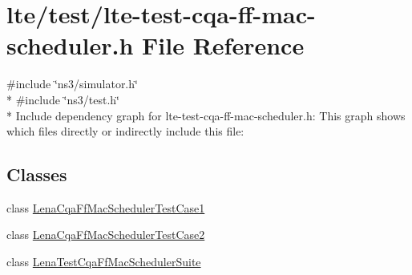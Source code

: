 \hypertarget{lte-test-cqa-ff-mac-scheduler_8h}{}\section{lte/test/lte-\/test-\/cqa-\/ff-\/mac-\/scheduler.h File Reference}
\label{lte-test-cqa-ff-mac-scheduler_8h}
{\ttfamily \#include \char`\"{}ns3/simulator.\+h\char`\"{}}\\*
{\ttfamily \#include \char`\"{}ns3/test.\+h\char`\"{}}\\*
Include dependency graph for lte-\/test-\/cqa-\/ff-\/mac-\/scheduler.h\+:
This graph shows which files directly or indirectly include this file\+:
\subsection*{Classes}
\begin{DoxyCompactItemize}
\item 
class \hyperlink{classLenaCqaFfMacSchedulerTestCase1}{Lena\+Cqa\+Ff\+Mac\+Scheduler\+Test\+Case1}
\item 
class \hyperlink{classLenaCqaFfMacSchedulerTestCase2}{Lena\+Cqa\+Ff\+Mac\+Scheduler\+Test\+Case2}
\item 
class \hyperlink{classLenaTestCqaFfMacSchedulerSuite}{Lena\+Test\+Cqa\+Ff\+Mac\+Scheduler\+Suite}
\end{DoxyCompactItemize}
